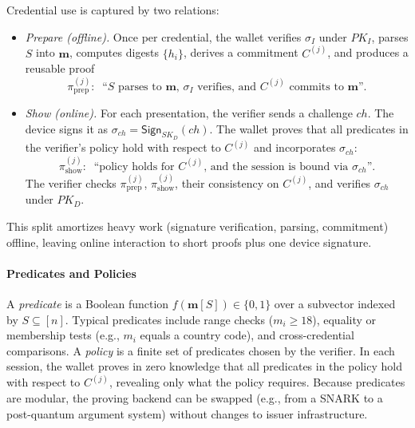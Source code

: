 Credential use is captured by two relations:
\begin{itemize}
  \item \emph{Prepare (offline).} Once per credential, the wallet verifies $\sigma_I$ under $PK_I$, parses $S$ into $\mathbf{m}$, computes digests $\{h_i\}$, derives a commitment $C^{(j)}$, and produces a reusable proof
  \[
    \pi_{\mathrm{prep}}^{(j)} : \;\; \text{``$S$ parses to $\mathbf{m}$, $\sigma_I$ verifies, and $C^{(j)}$ commits to $\mathbf{m}$''.}
  \]
  \item \emph{Show (online).} For each presentation, the verifier sends a challenge $\mathit{ch}$. The device signs it as $\sigma_{\mathit{ch}}=\mathsf{Sign}_{SK_D}(\mathit{ch})$. The wallet proves that all predicates in the verifier’s policy hold with respect to $C^{(j)}$ and incorporates $\sigma_{\mathit{ch}}$:
  \[
    \pi_{\mathrm{show}}^{(j)} : \;\; \text{``policy holds for $C^{(j)}$, and the session is bound via $\sigma_{\mathit{ch}}$''.}
  \]
  The verifier checks $\pi_{\mathrm{prep}}^{(j)}$, $\pi_{\mathrm{show}}^{(j)}$, their consistency on $C^{(j)}$, and verifies $\sigma_{\mathit{ch}}$ under $PK_D$.
\end{itemize}

This split amortizes heavy work (signature verification, parsing, commitment) offline, leaving online interaction to short proofs plus one device signature.

\paragraph{Predicates and Policies}
A \emph{predicate} is a Boolean function $f(\mathbf{m}[S]) \in \{0,1\}$ over a subvector indexed by $S \subseteq [n]$. 
Typical predicates include range checks ($m_i \ge 18$), equality or membership tests (e.g., $m_i$ equals a country code), and cross-credential comparisons. 
A \emph{policy} is a finite set of predicates chosen by the verifier. 
In each session, the wallet proves in zero knowledge that all predicates in the policy hold with respect to $C^{(j)}$, revealing only what the policy requires. 
Because predicates are modular, the proving backend can be swapped (e.g., from a SNARK to a post-quantum argument system) without changes to issuer infrastructure.


